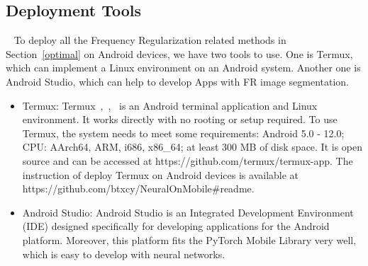 \documentclass[runningheads]{llncs}
\begin{document}
\subsection{Deployment Tools}~\label{deployment}
To deploy all the Frequency Regularization related methods in Section~\ref{optimal} on Android devices, we have two tools to use. One is Termux, which can implement a Linux environment on an Android system. Another one is Android Studio, which can help to develop Apps with FR image segmentation.
\begin{itemize}
	\item Termux: Termux~\cite{termux_repo},~\cite{termux_overview},~\cite{termux_wiki}  is an Android terminal application and Linux environment. It works directly with no rooting or setup required. To use Termux, the system needs to meet some requirements: Android 5.0 - 12.0; CPU: AArch64, ARM, i686, x86\_64; at least 300 MB of disk space. It is open source and can be accessed at https://github.com/termux/termux-app. The instruction of deploy Termux on Android devices is available at https://github.com/btxcy/NeuralOnMobile\#readme. 
	\item Android Studio: Android Studio is an Integrated Development Environment (IDE) designed specifically for developing applications for the Android platform. Moreover, this platform fits the PyTorch Mobile Library very well, which is easy to develop with neural networks.
\end{itemize}	 		
\end{document}
